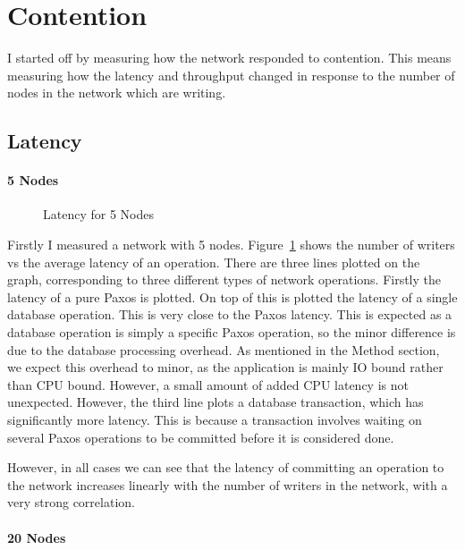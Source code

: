 \documentclass[12pt,twoside,notitlepage]{report}
\newcommand{\lwincludegraphics}[2][]{%
  \sbox{0}{\texttt{[image: \#2]}}%
  \ifdim\wd0>\linewidth
    \resizebox{\linewidth}{!}{\box0 }%
  \else
    \leavevmode\box0
  \fi}
\begin{document}
\section{Contention}

I started off by measuring how the network responded to contention. This means measuring how
the latency and throughput changed in response to the number of nodes in the network
which are writing.

\subsection{Latency}

\paragraph{5 Nodes}

\begin{figure}[H]
\centering
\lwincludegraphics[scale=2]{figs/lat_5.eps}
\caption{\label{fig:lat-5}Latency for 5 Nodes}
\end{figure}

Firstly I measured a network with 5 nodes. Figure~\ref{fig:lat-5} shows the number of writers vs
the average latency of an operation. There are three lines plotted on the graph, corresponding to
three different types of network operations. Firstly the latency of a pure Paxos is plotted. On
top of this is plotted the latency of a single database operation. This is very close to the Paxos
latency. This is expected as a database operation is simply a specific Paxos operation, so the
minor difference is due to the database processing overhead. As mentioned in the Method section,
we expect this overhead to minor, as the application is mainly IO bound rather than CPU bound.
However, a small amount of added CPU latency is not unexpected. However, the third line plots a
database transaction, which has significantly more latency. This is because a transaction involves
waiting on several Paxos operations to be committed before it is considered done.

However, in all cases we can see that the latency of committing an operation to the
network increases linearly with the number of writers in the network, with a very strong
correlation.

\paragraph{20 Nodes}
\end{document}
